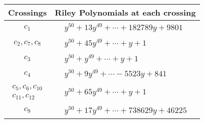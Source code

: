 \documentclass[1p]{elsarticle_modified}
\theoremstyle{definition}
\begin{document}
\begin{tabular}{m{50pt}|m{274pt}}
Crossings & \hspace{64pt}Riley Polynomials at each crossing \\
\hline $$\begin{aligned}c_{1}\end{aligned}$$&$\begin{aligned}
&y^{50}+13 y^{49}+\cdots+182789 y+9801
\end{aligned}$\\
\hline $$\begin{aligned}c_{2},c_{7},c_{8}\end{aligned}$$&$\begin{aligned}
&y^{50}+45 y^{49}+\cdots+y+1
\end{aligned}$\\
\hline $$\begin{aligned}c_{3}\end{aligned}$$&$\begin{aligned}
&y^{50}+y^{49}+\cdots+y+1
\end{aligned}$\\
\hline $$\begin{aligned}c_{4}\end{aligned}$$&$\begin{aligned}
&y^{50}+9 y^{49}+\cdots-5523 y+841
\end{aligned}$\\
\hline $$\begin{aligned}c_{5},c_{6},c_{10}\\c_{11},c_{12}\end{aligned}$$&$\begin{aligned}
&y^{50}+65 y^{49}+\cdots+y+1
\end{aligned}$\\
\hline $$\begin{aligned}c_{9}\end{aligned}$$&$\begin{aligned}
&y^{50}+17 y^{49}+\cdots+738629 y+46225
\end{aligned}$\\
\hline
\end{tabular}
\vskip 2pc
\end{document}
